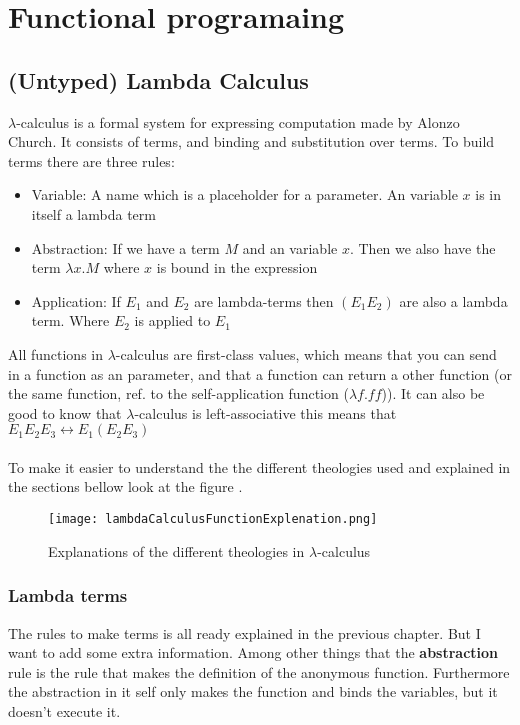 \section{Functional programaing}

\subsection{(Untyped) Lambda Calculus}
\label{Lambda Calculus}
$\lambda$-calculus is a formal system for expressing computation made by Alonzo Church. It consists of terms, and binding and substitution over terms. To build terms there are three rules:

\begin{itemize}
    \item Variable: A name which  is a placeholder for a parameter. An variable $x$ is in itself a lambda term 
    \item Abstraction: If we have a term $M$ and an variable $x$. Then we also have the term $\lambda x.M$ where $x$ is bound in the expression
    \item Application: If $E_1$ and $E_2$ are lambda-terms then $(E_1 E_2) $ are also a lambda term. Where $E_2$ is applied to $E_1$
\end{itemize}
All functions in $\lambda$-calculus are first-class values, which means that you can send in a function as an parameter, and that a function can return a other function (or the same function, ref. to the self-application function ($\lambda f.ff$)). It can also be good to know that $\lambda$-calculus is left-associative this means that $E_1 E_2 E_3 \leftrightarrow E_1 (E_2 E_3)$  \\ \\
To make it easier to understand the the different theologies used and explained in the sections bellow look at the figure . 

\begin{figure}
    \centering
    \texttt{[image: lambdaCalculusFunctionExplenation.png]}
    \caption{Explanations of the different 
theologies in $\lambda$-calculus}
    \label{fig:LC-explenations}
\end{figure}


\subsubsection{Lambda terms}
The rules to make terms is all ready explained in the previous chapter. But I want to add some extra information. Among other things that the \textbf{abstraction} rule is the rule that makes the definition of the anonymous function. Furthermore the abstraction in it self only makes the function and binds the variables, but it doesn't execute it. 

